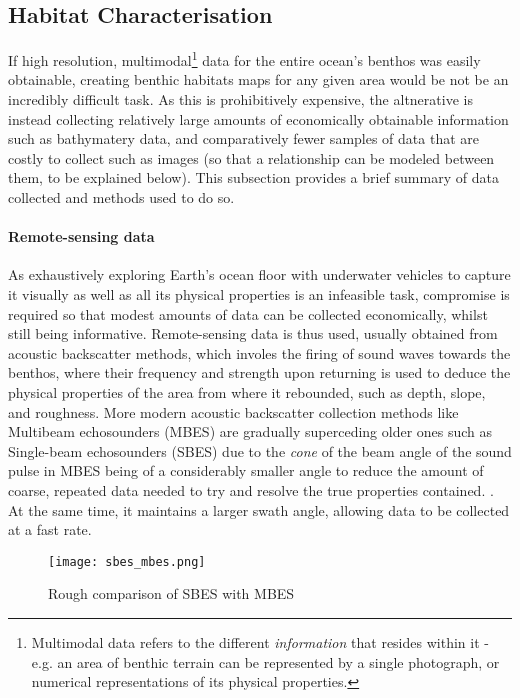 \subsection{Habitat Characterisation}
If high resolution, multimodal\footnote{Multimodal data refers to the different \textit{information} that resides within it - e.g. an area of benthic terrain can be represented by a single photograph, or numerical representations of its physical properties.} data for the entire ocean's benthos was easily obtainable, creating benthic habitats maps for any given area would be not be an incredibly difficult task. As this is prohibitively expensive, the altnerative is instead collecting relatively large amounts of economically obtainable information such as bathymatery data, and comparatively fewer samples of data that are costly to collect such as images (so that a relationship can be modeled between them, to be explained below). This subsection provides a brief summary of data collected and methods used to do so.

\paragraph{Remote-sensing data}
As exhaustively exploring Earth's ocean floor with underwater vehicles to capture it visually as well as all its physical properties is an infeasible task, compromise is required so that modest amounts of data can be collected economically, whilst still being informative. Remote-sensing data is thus used, usually obtained from acoustic backscatter methods, which involes the firing of sound waves towards the benthos, where their frequency and strength upon returning is used to deduce the physical properties of the area from where it rebounded, such as depth, slope, and roughness. More modern acoustic backscatter collection methods like Multibeam echosounders (MBES) are gradually superceding older ones such as Single-beam echosounders (SBES)\citep{calvert15} due to the \textit{cone} of the beam angle of the sound pulse in MBES being of a considerably smaller angle to reduce the amount of coarse, repeated data needed to try and resolve the true properties contained. \citep{cjbrown11}. At the same time, it maintains a larger swath angle, allowing data to be collected at a fast rate.

\begin{figure}[H]
    \texttt{[image: sbes\_mbes.png]}
    \caption{Rough comparison of SBES with MBES \citep{braveheartmarine}}
    \label{fig:sbes_mbes}
\end{figure}


